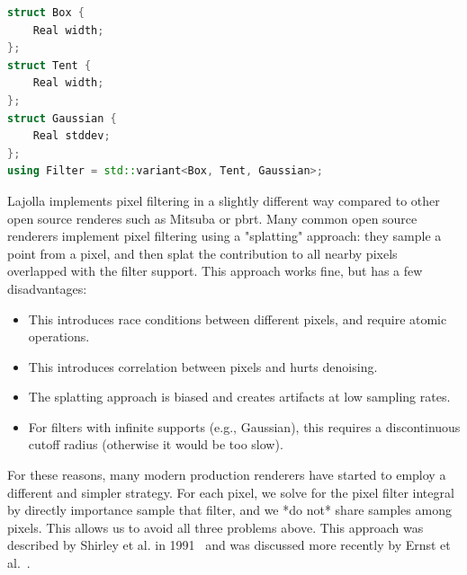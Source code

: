 \documentclass{article}
\begin{document}
\begin{lstlisting}[language=c++]
struct Box {
    Real width;
};
struct Tent {
    Real width;
};
struct Gaussian {
    Real stddev;
};
using Filter = std::variant<Box, Tent, Gaussian>;
\end{lstlisting}

Lajolla implements pixel filtering in a slightly different way compared to other open source renderes such as Mitsuba or pbrt. Many common open source renderers implement pixel filtering using a "splatting" approach: they sample a point from a pixel, and then splat the contribution to all nearby pixels overlapped with the filter support. This approach works fine, but has a few disadvantages:
\begin{itemize}
    \item This introduces race conditions between different pixels, and require atomic operations.
    \item This introduces correlation between pixels and hurts denoising.
    \item The splatting approach is biased and creates artifacts at low sampling rates.
    \item For filters with infinite supports (e.g., Gaussian), this requires a discontinuous cutoff radius (otherwise it would be too slow).
\end{itemize}
For these reasons, many modern production renderers have started to employ a different and simpler strategy. For each pixel, we solve for the pixel filter integral by directly importance sample that filter, and we *do not* share samples among pixels. This allows us to avoid all three problems above. This approach was described by Shirley et al. in 1991~\cite{Shirley:1991:RTF} and was discussed more recently by Ernst et al.~\cite{Ernst:2006:FIS}.
\end{document}
